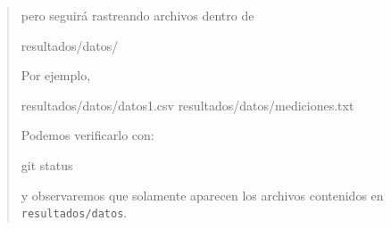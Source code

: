 \documentclass[
  spanish,
  12pt,
  letterpaper,
  DIV=11,
  numbers=noendperiod]{scrreprt}
\newenvironment{Shaded}{\begin{snugshade}}{\end{snugshade}}
\newcommand{\FunctionTok}[1]{\textcolor[rgb]{0.28,0.35,0.67}{#1}}
\newcommand{\NormalTok}[1]{\textcolor[rgb]{0.00,0.23,0.31}{#1}}
\begin{document}
\begin{tcolorbox}
\begin{quote}
pero seguirá rastreando archivos dentro de

\begin{Shaded}
\begin{Highlighting}[]
\NormalTok{resultados/datos/}
\end{Highlighting}
\end{Shaded}

Por ejemplo,

\begin{Shaded}
\begin{Highlighting}[]
\NormalTok{resultados/datos/datos1.csv}
\NormalTok{resultados/datos/mediciones.txt}
\end{Highlighting}
\end{Shaded}

Podemos verificarlo con:

\begin{Shaded}
\begin{Highlighting}[]
\FunctionTok{git}\NormalTok{ status}
\end{Highlighting}
\end{Shaded}

y observaremos que solamente aparecen los archivos contenidos en
\texttt{resultados/datos}.
\end{quote}

\end{tcolorbox}
\end{document}
